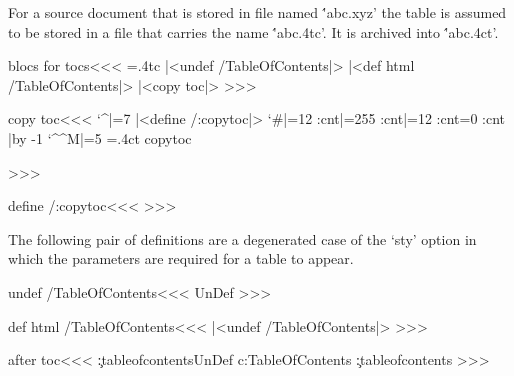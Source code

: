 {{

For a source document that is stored in file named \''abc.xyz' the
table is assumed to be stored in a file that carries the name
\''abc.4tc'.  It is archived into \''abc.4ct'.

\<blocs for tocs\><<<
=\jobname.4tc
  
   \def\:TableOfContents[#1]{\immediate\write16{No file \jobname.4tc}}
   |<undef /TableOfContents|>
\else  
   \ifHtml  |<def html /TableOfContents|>
   \fi
   |<copy toc|>  
\fi
>>>


\<copy toc\><<<
\begingroup
  \catcode`^|=7  
  |<define /:copytoc|>   \ifHtml \catcode`\#|=12\relax \fi
  \def\:next{\catcode\tmp:cnt|=12
    \ifnum \tmp:cnt=0
       \def\:next{%
          \catcode`\^^M|=5
          \immediate\openout15=\jobname.4ct     \:copytoc
          \immediate\closeout15
          \endgroup \closein15
       }%
    \fi
    \advance\tmp:cnt |by -1 \:next
  }
  \tmp:cnt|=255   \:next 
>>>


\<define /:copytoc\><<<
\def\:copytoc{%
   \ifeof15   \else
      \read15 to \:temp
      {\escapechar=`\\\immediate\write15{\:temp}}%
      \expandafter\:copytoc
   \fi}
>>>







The following pair of definitions are a degenerated case of the `sty' option
in which the parameters are required for a table to appear.

\<undef /TableOfContents\><<<
\ifx \TableOfContents\:UnDef
   \def\TableOfContents{\futurelet\:temp\:TOC}
   \def\:TOC{\ifx [\:temp \expandafter\:TableOfContents\fi}
\fi
>>>



\<def html /TableOfContents\><<<
|<undef /TableOfContents|>
\def\:TableOfContents[#1]{\SaveEverypar{%
   \def\TocCount{0}%
   |<interpretation for entries|>%
   \def\InsertTitle##1##2##3{}%
   \hsize|=4.5in  \rightskip |= \z@ minus 1in  \linepenalty|=1000
   \catcode`\#|=12  \catcode`\@|=11   \catcode`\:|=11  
   |<Configure HtmlPar for TOC|>\everypar{\HtmlPar}%
   |<before toc|> \jobname.4ct
   {\ht:everypar{}\leavevmode}|<bottom toc|>%
   \par  }\RecallEverypar |<after toc|>} 
>>>

\<after toc\><<<
\ifx \c:tableofcontents\:UnDef 
   \csname c:TableOfContents\endcsname
\else \c:tableofcontents \fi
>>>

}}
